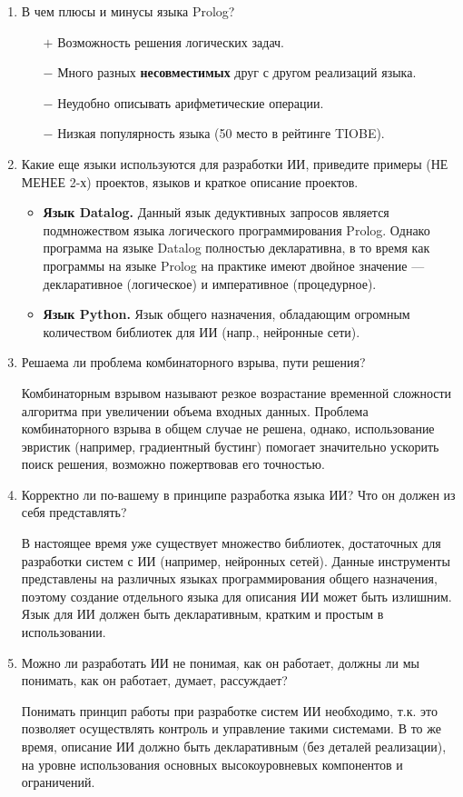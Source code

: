 \begin{enumerate}
	\item В чем плюсы и минусы языка Prolog?
	\begin{itemize}
		\item[$+$] Возможность решения логических задач.
		\item[$-$] Много разных \textbf{несовместимых} друг с другом реализаций языка.
		\item[$-$] Неудобно описывать арифметические операции.
		\item[$-$] Низкая популярность языка (50 место в рейтинге TIOBE).
	\end{itemize}
	
	\item Какие еще языки используются для разработки ИИ, приведите примеры (НЕ МЕНЕЕ 2-х) проектов, языков и краткое описание проектов.
	\begin{itemize}
		\item \textbf{Язык Datalog.} Данный язык дедуктивных запросов является подмножеством языка логического программирования Prolog. Однако программа на языке Datalog полностью декларативна, в то время как программы на языке Prolog на практике имеют двойное значение — декларативное (логическое) и императивное (процедурное).
		\item \textbf{Язык Python.} Язык общего назначения, обладающим огромным количеством библиотек для ИИ (напр., нейронные сети).
	\end{itemize}
	
	\item Решаема ли проблема комбинаторного взрыва, пути решения?
	
	Комбинаторным взрывом называют резкое возрастание временной сложности алгоритма при увеличении объема входных данных. Проблема комбинаторного взрыва в общем случае не решена, однако, использование эвристик (например, градиентный бустинг) помогает значительно ускорить поиск решения, возможно пожертвовав его точностью.
	
	\item Корректно ли по-вашему в принципе разработка языка ИИ? Что он должен из себя представлять?
	
	В настоящее время уже существует множество библиотек, достаточных для разработки систем с ИИ (например, нейронных сетей). Данные инструменты представлены на различных языках программирования общего назначения, поэтому создание отдельного языка для описания ИИ может быть излишним. Язык для ИИ должен быть декларативным, кратким и простым в использовании.
	
	\item Можно ли разработать ИИ не понимая, как он работает, должны ли мы понимать, как он работает, думает, рассуждает?
	
	Понимать принцип работы при разработке систем ИИ необходимо, т.к. это позволяет осуществлять контроль и управление такими системами. В то же время, описание ИИ должно быть декларативным (без деталей реализации), на уровне использования основных высокоуровневых компонентов и ограничений.
	
\end{enumerate}

